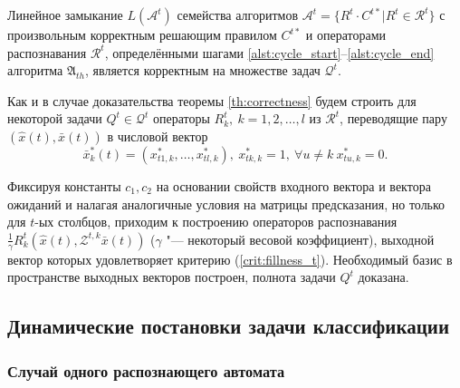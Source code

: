 \begin{Theorem}
	\label{th:correctness_t}
	Линейное замыкание $L(\mathcal A^t)$ семейства алгоритмов $\mathcal A^t=\{R^t\cdot C^{t*}|R^t\in\mathcal R^t\}$ с произвольным корректным решающим правилом $C^{t*}$ и операторами распознавания $\mathcal R^t$, определёнными шагами \ref{alst:cycle_start}--\ref{alst:cycle_end} алгоритма $\mathfrak A_{th}$, является корректным на множестве задач $\mathcal Q^t$.
\end{Theorem}

\begin{Proof}
	Как и в случае доказательства теоремы \ref{th:correctness} будем строить для некоторой задачи $Q^t\in \mathcal Q^t$ операторы $R_k^t,\ k=1,2,\dots,l$ из $\mathcal R^t$, переводящие пару $(\hat x(t), \bar x(t))$ в числовой вектор
	\begin{equation}\label{crit:fillness_t}
		\bar x_k^*(t)=(x_{t1,k}^*,\dots,x_{tl,k}^*),\ x_{tk,k}^*=1,\ \forall u\neq k\ x_{tu,k}^*=0.
	\end{equation}
	
	Фиксируя константы $c_1,c_2$ на основании свойств входного вектора и вектора ожиданий и налагая аналогичные условия на матрицы предсказания, но только для $t$-ых столбцов, приходим к построению операторов распознавания $\frac{1}{\gamma}R_k^t(\hat x(t),\mathcal Z^{t,k} \bar x(t))$ ($\gamma$ "--- некоторый весовой коэффициент), выходной вектор которых удовлетворяет критерию (\ref{crit:fillness_t}). Необходимый базис в пространстве выходных векторов построен, полнота задачи $Q^t$ доказана.
\end{Proof}

\subsection{Динамические постановки задачи классификации}

\subsubsection{Случай одного распознающего автомата}


